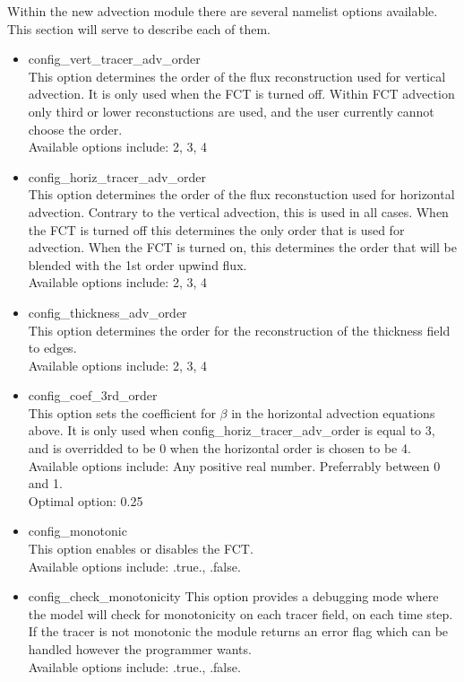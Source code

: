 \documentclass[11pt]{report}
\begin{document}
Within the new advection module there are several namelist options available.
This section will serve to describe each of them.

\begin{itemize}
	\item config\_vert\_tracer\_adv\_order \\
		This option determines the order of the flux reconstruction used for
		vertical advection. It is only used when the FCT is turned off. Within
		FCT advection only third or lower reconstuctions are used, and the user
		currently cannot choose the order. \\
		Available options include: 2, 3, 4
	\item config\_horiz\_tracer\_adv\_order  \\
		This option determines the order of the flux reconstuction used for
		horizontal advection. Contrary to the vertical advection, this is used
		in all cases. When the FCT is turned off this determines the only order
		that is used for advection. When the FCT is turned on, this determines
		the order that will be blended with the 1st order upwind flux. \\
		Available options include: 2, 3, 4
	\item config\_thickness\_adv\_order \\
		This option determines the order for the reconstruction of the
		thickness field to edges. \\
		Available options include: 2, 3, 4
	\item config\_coef\_3rd\_order \\
		This option sets the coefficient for $\beta$ in the horizontal
		advection equations above. It is only used when
		config\_horiz\_tracer\_adv\_order is equal to 3, and is overridded to
		be 0 when the horizontal order is chosen to be 4. \\
		Available options include: Any positive real number. Preferrably between 0 and 1. \\
		Optimal option: 0.25
	\item config\_monotonic \\
		This option enables or disables the FCT. \\
		Available options include: .true., .false.
	\item config\_check\_monotonicity
		This option provides a debugging mode where the model will check for
		monotonicity on each tracer field, on each time step. If the tracer is
		not monotonic the module returns an error flag which can be handled
		however the programmer wants. \\
		Available options include: .true., .false.
\end{itemize}
\end{document}

